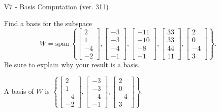\begin{exercise}
  \begin{exerciseTitle}V7 - Basis Computation (ver. 311)\end{exerciseTitle}
  \begin{exerciseStatement}
    Find a basis for the subspace 
\[W=\mathrm{span}\ \left\{\left[\begin{array}{r}
2 \\
1 \\
-4 \\
-2
\end{array}\right] , \left[\begin{array}{r}
-3 \\
-3 \\
-4 \\
-1
\end{array}\right] , \left[\begin{array}{r}
-11 \\
-10 \\
-8 \\
-1
\end{array}\right] , \left[\begin{array}{r}
33 \\
33 \\
44 \\
11
\end{array}\right] , \left[\begin{array}{r}
2 \\
0 \\
-4 \\
3
\end{array}\right]\right\}.\]
 Be sure to explain why your result is a basis.


  \end{exerciseStatement}
  \begin{exerciseAnswer}
   A basis of \(W\) is  \(\left\{\left[\begin{array}{r}
2 \\
1 \\
-4 \\
-2
\end{array}\right] , \left[\begin{array}{r}
-3 \\
-3 \\
-4 \\
-1
\end{array}\right] , \left[\begin{array}{r}
2 \\
0 \\
-4 \\
3
\end{array}\right]\right\}\).
  


  \end{exerciseAnswer}
\end{exercise}